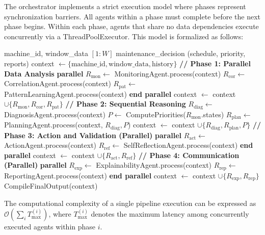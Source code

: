 The orchestrator implements a strict execution model where phases represent synchronization
barriers. All agents within a phase must complete before the next phase begins. Within each phase, agents that share no data dependencies execute concurrently via a ThreadPoolExecutor. This model is formalized as follows:
\begin{algorithm}[!htbp]
\small
\caption{Multi-Agent Phased Orchestration}
\label{alg:multi_agent}
\begin{algorithmic}[1]
\Require machine\_id, window\_data $[1{:}W]$
\Ensure maintenance\_decision (schedule, priority, reports)
\State context $\gets \{ \text{machine\_id}, \text{window\_data}, \text{history} \}$
\Statex \textbf{// Phase 1: Parallel Data Analysis}
\State \textbf{parallel}
\Statex \hspace{1em} $R_{\text{mon}} \gets$ MonitoringAgent.process(context)
\Statex \hspace{1em} $R_{\text{cor}} \gets$ CorrelationAgent.process(context)
\Statex \hspace{1em} $R_{\text{pat}} \gets$ PatternLearningAgent.process(context)
\State \textbf{end parallel}
\State context $\gets$ context $\cup \{R_{\text{mon}}, R_{\text{cor}}, R_{\text{pat}}\}$
\Statex
\Statex \textbf{// Phase 2: Sequential Reasoning}
\State $R_{\text{diag}} \gets$ DiagnosisAgent.process(context)
\State $P \gets$ ComputePriorities($R_{\text{mon}}$.states)
\State $R_{\text{plan}} \gets$ PlanningAgent.process(context, $R_{\text{diag}}, P$)
\State context $\gets$ context $\cup \{R_{\text{diag}}, R_{\text{plan}}, P\}$
\Statex
\Statex \textbf{// Phase 3: Action and Validation (Parallel)}
\State \textbf{parallel}
\Statex \hspace{1em} $R_{\text{act}} \gets$ ActionAgent.process(context)
\Statex \hspace{1em} $R_{\text{ref}} \gets$ SelfReflectionAgent.process(context)
\State \textbf{end parallel}
\State context $\gets$ context $\cup \{R_{\text{act}}, R_{\text{ref}}\}$
\Statex
\Statex \textbf{// Phase 4: Communication (Parallel)}
\State \textbf{parallel}
\Statex \hspace{1em} $R_{\text{exp}} \gets$ ExplainabilityAgent.process(context)
\Statex \hspace{1em} $R_{\text{rep}} \gets$ ReportingAgent.process(context)
\State \textbf{end parallel}
\State context $\gets$ context $\cup \{R_{\text{exp}}, R_{\text{rep}}\}$
\Statex
\State \Return CompileFinalOutput(context)
\end{algorithmic}
\end{algorithm}
The computational complexity of a single pipeline execution can be expressed as 
$\mathcal{O}\!\left(\sum_{i} T_{\max}^{(i)}\right)$, where $T_{\max}^{(i)}$ denotes the maximum latency among concurrently executed agents within phase $i$. 

